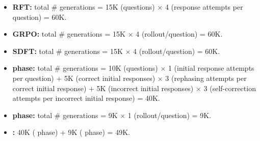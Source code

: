 

\begin{itemize}
    \item \textbf{RFT:} total \# generations = 15K (questions) $\times$ 4 (response attempts per question) = 60K.
    \item \textbf{GRPO:} total \# generations = 15K $\times$ 4 (rollout/question) = 60K.
    \item \textbf{SDFT:} total \# generations = 15K $\times$ 4 (rollout/question) = 60K.
    \item \textbf{\sft{} phase:} total \# generations = 10K (questions) $\times$ 1 (initial response attempts per question) + 5K (correct initial responses) $\times$ 3 (rephasing attempts per correct initial response) + 5K (incorrect initial responses) $\times$ 3 (self-correction attempts per incorrect initial response) = 40K. 
    \item \textbf{\opsd{} phase:} total \# generations = 9K $\times$ 1 (rollout/question) = 9K. 
    \item \textbf{\ours{}:} 40K (\sft{} phase) + 9K (\opsd{} phase) = 49K.
\end{itemize}


